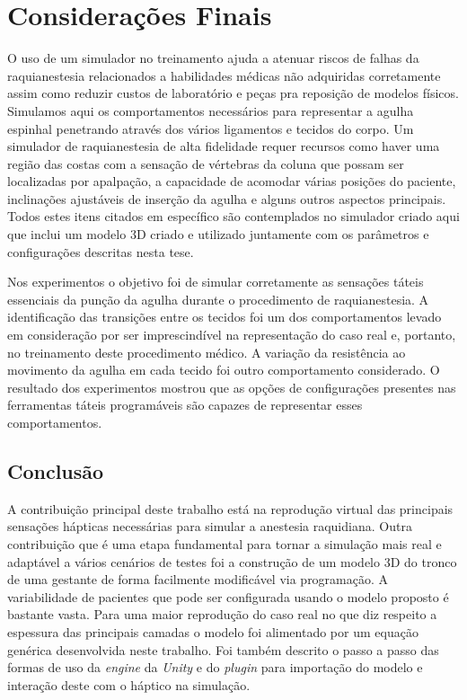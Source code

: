 \chapter{Considerações Finais} \label{cap:cap6}

O uso de um simulador no treinamento ajuda a atenuar riscos de falhas da raquianestesia relacionados a habilidades médicas não adquiridas corretamente assim como reduzir custos de laboratório e peças pra reposição de modelos físicos. Simulamos aqui os comportamentos necessários para representar a agulha espinhal penetrando através dos vários ligamentos e tecidos do corpo. Um simulador de raquianestesia de alta fidelidade requer recursos como haver uma região das costas com a sensação de vértebras da coluna que possam ser localizadas por apalpação, a capacidade de acomodar várias posições do paciente, inclinações ajustáveis de inserção da agulha e alguns outros aspectos principais. Todos estes itens citados em específico são contemplados no simulador criado aqui que inclui um modelo 3D criado e utilizado juntamente com os parâmetros e configurações descritas nesta tese. 

Nos experimentos o objetivo foi de simular corretamente as sensações táteis essenciais da punção da agulha durante o procedimento de raquianestesia. A identificação das transições entre os tecidos foi um dos comportamentos levado em consideração por ser imprescindível na representação do caso real e, portanto, no treinamento deste procedimento médico.
A variação da resistência ao movimento da agulha em cada tecido foi outro comportamento considerado. O resultado dos experimentos mostrou que as opções de configurações presentes nas ferramentas táteis programáveis são capazes de representar esses comportamentos.

\section{Conclusão}
\label{sec:conclusão}

A contribuição principal deste trabalho está na reprodução virtual das principais sensações hápticas necessárias para simular a anestesia raquidiana. Outra contribuição que é uma etapa fundamental para tornar a simulação mais real e adaptável a vários cenários de testes foi a construção de um modelo 3D do tronco de uma gestante de forma facilmente modificável via programação. A variabilidade de pacientes que pode ser configurada usando o modelo proposto é bastante vasta. Para uma maior reprodução do caso real no que diz respeito a espessura das principais camadas o modelo foi alimentado por um equação genérica desenvolvida neste trabalho. Foi também descrito o passo a passo das formas de uso da \textit{engine} da \textit{Unity} e do \textit{plugin} para importação do modelo e interação deste com o háptico na simulação. 

